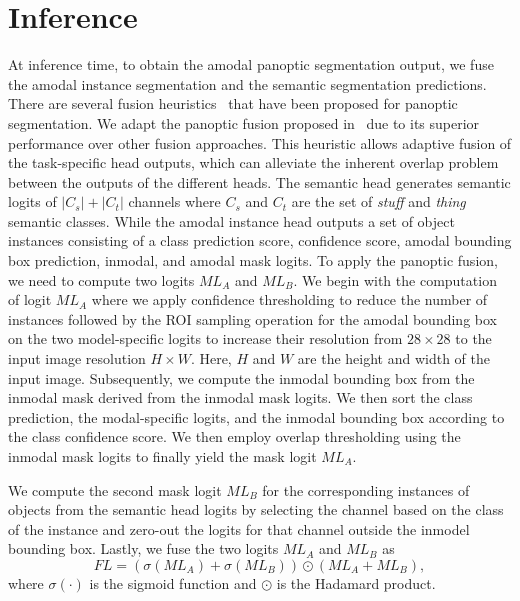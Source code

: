 \documentclass[10pt,twocolumn,letterpaper]{article}
\begin{document}
\section{Inference}
\label{sec:supp_inference}

At inference time, to obtain the amodal panoptic segmentation output, we fuse the amodal instance segmentation and the semantic segmentation predictions. There are several fusion heuristics~\cite{kirillov2019panoptic, xiong2019upsnet, mohan2020efficientps} that have been proposed for panoptic segmentation. We adapt the panoptic fusion proposed in~\cite{mohan2020efficientps} due to its superior performance over other fusion approaches. This heuristic allows adaptive fusion of the task-specific head outputs, which can alleviate the inherent overlap problem between the outputs of the different heads. The semantic head generates semantic logits of $|C_{s}|+|C_{t}|$ channels where $C_{s}$ and $C_{t}$ are the set of \textit{stuff} and \textit{thing} semantic classes. While the amodal instance head outputs a set of object instances consisting of a class prediction score, confidence score, amodal bounding box prediction, inmodal, and amodal mask logits. To apply the panoptic fusion, we need to compute two logits $ML_A$ and $ML_B$. We begin with the computation of logit $ML_A$ where we apply confidence thresholding to reduce the number of instances followed by the ROI sampling operation for the amodal bounding box on the two model-specific logits to increase their resolution from $28\times28$ to the input image resolution $H\times W$. Here, $H$ and $W$ are the height and width of the input image. Subsequently, we compute the inmodal bounding box from the inmodal mask derived from the inmodal mask logits. We then sort the class prediction, the modal-specific logits, and the inmodal bounding box according to the class confidence score. We then employ overlap thresholding using the inmodal mask logits to finally yield the mask logit $ML_A$.

We compute the second mask logit $ML_B$ for the corresponding instances of objects from the semantic head logits by selecting the channel based on the class of the instance and zero-out the logits for that channel outside the inmodel bounding box. Lastly, we fuse the two logits $ML_A$ and $ML_B$ as
\begin{equation}
FL = (\sigma(ML_A) + \sigma(ML_B) ) \odot (ML_A + ML_B),
\end{equation}
where $\sigma (\cdot)$ is the sigmoid function and $\odot$ is the Hadamard product.
\end{document}
